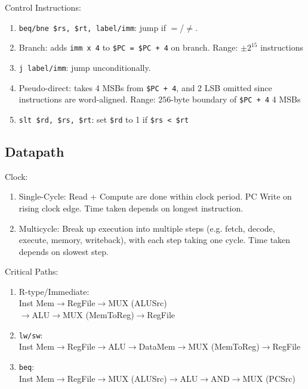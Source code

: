 \documentclass[12pt, a4paper]{article}
\begin{document}
\begin{multicols*}{3}
Control Instructions:
\begin{enumerate}[\roman*.]
  \item \lstinline|beq/bne $rs, $rt, label/imm|: jump if $=$/$\neq$.
  \item Branch: adds \lstinline|imm x 4| to \lstinline|$PC = $PC + 4| on branch. Range: $\pm 2^{15}$ instructions
  \item \lstinline|j label/imm|: jump unconditionally.
  \item Pseudo-direct: takes 4 MSBs from \lstinline|$PC + 4|, and 2 LSB omitted since instructions are word-aligned. Range: $256$-byte boundary of \lstinline|$PC + 4| 4 MSBs
  \item \lstinline|slt $rd, $rs, $rt|: set \lstinline|$rd| to 1 if \lstinline|$rs < $rt|
\end{enumerate}
\colbreak

\subsection{Datapath}

Clock:
\begin{enumerate}[\roman*.]
  \item Single-Cycle: Read + Compute are done within clock period. PC Write on rising clock edge. Time taken depends on longest instruction.
  \item Multicycle: Break up execution into multiple steps (e.g. fetch, decode, execute, memory, writeback), with each step taking one cycle. Time taken depends on slowest step.\\
\end{enumerate}

Critical Paths:
\begin{enumerate}[\roman*.]
  \item R-type/Immediate:\\
    Inst Mem$\rightarrow$RegFile$\rightarrow$MUX (ALUSrc)\\$\rightarrow$ALU$\rightarrow$MUX (MemToReg)$\rightarrow$RegFile
  \item \lstinline|lw/sw|:\\
    Inst Mem$\rightarrow$RegFile$\rightarrow$ALU$\rightarrow$DataMem$\rightarrow$MUX (MemToReg)$\rightarrow$RegFile
  \item \lstinline|beq|:\\
    Inst Mem$\rightarrow$RegFile$\rightarrow$MUX (ALUSrc)$\rightarrow$ALU$\rightarrow$AND$\rightarrow$MUX (PCSrc)
\end{enumerate}


\end{multicols*}
\end{document}
